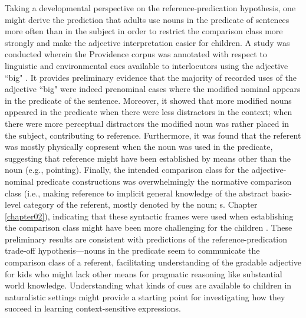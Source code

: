 Taking a developmental perspective on the reference-predication hypothesis, one might derive the prediction that adults use nouns in the predicate of sentences more often than in the subject in order to restrict the comparison class more strongly and make the adjective interpretation easier for children. A study was conducted wherein the Providence corpus was annotated with respect to linguistic and environmental cues available to interlocutors using the adjective ``big" \parencite{sinelnikova2020}. It provides preliminary evidence that the majority of recorded uses of the adjective ``big" were indeed prenominal cases where the modified nominal appears in the predicate of the sentence. 
Moreover, it showed that more modified nouns appeared in the predicate when there were less distractors in the context; when there were more perceptual distractors the modified noun was rather placed in the subject, contributing to reference. Furthermore, it was found that the referent was mostly physically copresent when the noun was used in the predicate, suggesting that reference might have been established by means other than the noun (e.g., pointing). Finally, the intended comparison class for the adjective-nominal predicate constructions was overwhelmingly the normative comparison class (i.e., making reference to implicit general knowledge of the abstract basic-level  category of the referent, mostly denoted by the noun; s. Chapter \ref{chapter02}), indicating that these syntactic frames were used when establishing the comparison class might have been more challenging for the children \parencite{sinelnikova2020}. These preliminary results are consistent with predictions of the reference-predication trade-off hypothesis---nouns in the predicate seem to communicate the comparison class of a referent, facilitating understanding of the gradable adjective for kids who might lack other means for pragmatic reasoning like substantial world knowledge. Understanding what kinds of cues are available to children in naturalistic settings might provide a starting point for investigating how they succeed in learning context-sensitive expressions. 



